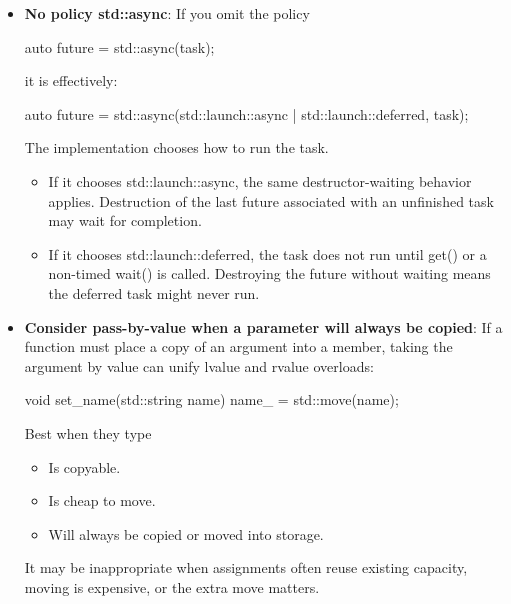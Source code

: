 \documentclass{report}
\begin{document}
\begin{itemize}
\begin{cppcode}
                future.valid(); // false
            \end{cppcode}
            \bigbreak \noindent 
            By contrast, wait() only waits; it does not consume the result:
        \item \textbf{No policy std::async}: If you omit the policy
            \bigbreak \noindent 
            \begin{cppcode}
            auto future = std::async(task);
            \end{cppcode}
            \bigbreak \noindent 
            it is effectively:
            \bigbreak \noindent 
            \begin{cppcode}
                auto future = std::async(std::launch::async | std::launch::deferred, task);
            \end{cppcode}
            \bigbreak \noindent 
            The implementation chooses how to run the task.
            \begin{itemize}
                \item If it chooses std::launch::async, the same destructor-waiting behavior applies. Destruction of the last future associated with an unfinished task may wait for completion.
                \item If it chooses std::launch::deferred, the task does not run until get() or a non-timed wait() is called. Destroying the future without waiting means the deferred task might never run.
            \end{itemize}
        \item \textbf{Consider pass-by-value when a parameter will always be copied}: If a function must place a copy of an argument into a member, taking the argument by value can unify lvalue and rvalue overloads:
            \bigbreak \noindent 
            \begin{cppcode}
                void set_name(std::string name) {
                    name_ = std::move(name);
                }
            \end{cppcode}
            \bigbreak \noindent 
            Best when they type
            \begin{itemize}
                \item Is copyable.
                \item Is cheap to move.
                \item Will always be copied or moved into storage.
            \end{itemize}
            It may be inappropriate when assignments often reuse existing capacity, moving is expensive, or the extra move matters.

\end{itemize}
\end{document}
